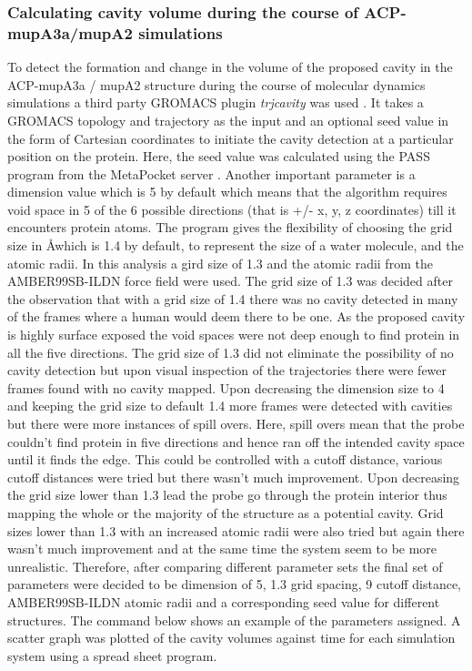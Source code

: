 			\subsubsection{Calculating cavity volume during the course of ACP-mupA3a/mupA2 simulations}
			\label{sec:calCavVolume}
			To detect the formation and change in the volume of the proposed cavity in the ACP-mupA3a / mupA2 structure during the course of molecular dynamics simulations a third party GROMACS plugin \textit{trj\textunderscore cavity} was used \parencite{Paramo2014}. %
			It takes a GROMACS topology and trajectory as the input and an optional seed value in the form of Cartesian coordinates to initiate the cavity detection at a particular position on the protein. Here, the seed value was calculated using the PASS program from the MetaPocket server \parencite{Huang2009}. Another important parameter is a dimension value which is 5 by default which means that the algorithm requires void space in 5 of the 6 possible directions (that is +/- x, y, z coordinates) till it encounters protein atoms. The program gives the flexibility of choosing the grid size in \AA which is 1.4 by default, to represent the size of a water molecule, and the atomic radii. In this analysis a gird size of 1.3 and the atomic radii from the AMBER99SB-ILDN force field were used. The grid size of 1.3 was decided after the observation that with a grid size of 1.4 there was no cavity detected in many of the frames where a human would deem there to be one. As the proposed cavity is highly surface exposed the void spaces were not deep enough to find protein in all the five directions. The grid size of 1.3 did not eliminate the possibility of no cavity detection but upon visual inspection of the trajectories there were fewer frames found with no cavity mapped. Upon decreasing the dimension size to 4 and keeping the grid size to default 1.4 more frames were detected with cavities but there were more instances of spill overs. Here, spill overs mean that the probe couldn't find protein in five directions and hence ran off the intended cavity space until it finds the edge. This could be controlled with a cutoff distance, various cutoff distances were tried but there wasn't much improvement. Upon decreasing the grid size lower than 1.3 lead the probe go through the  protein interior thus mapping the whole or the majority of the structure as a potential cavity. Grid sizes lower than 1.3 with an increased atomic radii were also tried but again there wasn't much improvement and at the same time the system seem to be more unrealistic. Therefore, after comparing different parameter sets the final set of parameters were decided to be dimension of 5, 1.3 grid spacing, 9 cutoff distance, AMBER99SB-ILDN atomic radii and a corresponding seed value for different structures. The command below shows an example of the parameters assigned. A scatter graph was plotted of the cavity volumes against time for each simulation system using a spread sheet program.
			
